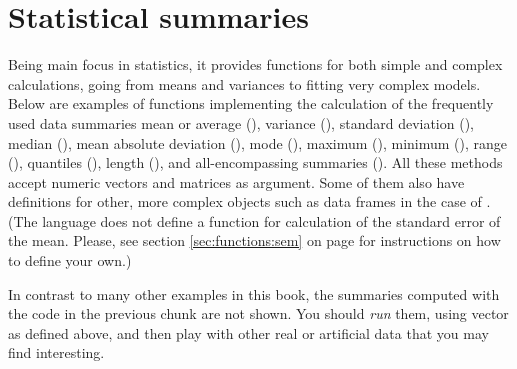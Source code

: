 \documentclass[krantz2]{krantz}\usepackage{knitr}%
\begin{document}
\section{Statistical summaries}
%
Being \Rlang main focus in statistics, it provides functions for both simple and complex calculations, going from means and variances to fitting very complex models. Below are examples of functions implementing the calculation of the frequently used data summaries mean or average (), variance (), standard deviation (), median (), mean absolute deviation (), mode (), maximum (), minimum (), range (), quantiles (), length (), and all-encompassing summaries (). All these methods accept numeric vectors and matrices as argument. Some of them also have definitions for other, more complex objects such as data frames in the case of . (The \Rlang language does not define a function for calculation of the standard error of the mean. Please, see section \ref{sec:functions:sem} on page \pageref{sec:functions:sem} for instructions on how to define your own.)

\begin{knitrout}\footnotesize
{}\color{fgcolor}\begin{kframe}
\begin{alltt}
 \hlkwb{<-} \hlopt{:}
\end{alltt}
\end{kframe}
\end{knitrout}

\begin{playground}
  In contrast to many other examples in this book, the summaries computed with the code in the previous chunk are not shown. You should \emph{run} them, using vector  as defined above, and then play with other real or artificial data that you may find interesting.%
\end{playground}
\end{document}
